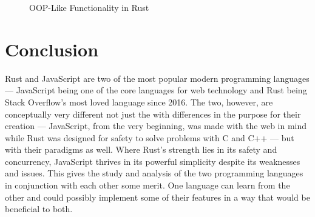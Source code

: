\documentclass{article}
\newcommand{\rust}[1]{\inputminted{rust}{samples/rust/#1.rs}}
\begin{document}
  \begin{figure}[ht]
    \rust{objects}
    \caption{OOP-Like Functionality in Rust}
    \label{fig:objects}
  \end{figure}

  \section{Conclusion}
  Rust and JavaScript are two of the most popular modern programming
  languages --- JavaScript being one of the core languages for web technology
  and Rust being Stack Overflow’s most loved language since 2016. The two,
  however, are conceptually very different not just the with differences in the
  purpose for their creation --- JavaScript, from the very beginning, was made
  with the web in mind while Rust was designed for safety to solve problems with
  C and C++ --- but with their paradigms as well. Where Rust's strength lies in its
  safety and concurrency, JavaScript thrives in its powerful simplicity despite its
  weaknesses and issues. This gives the study and analysis of the two programming languages 
  in conjunction with each other some merit. One language can learn from the other and 
  could possibly implement some of their features in a way that would be beneficial to both. 

  \newpage
  \nocite{*} \printbibliography[heading=bibintoc,title={References}]{}
\end{document}
